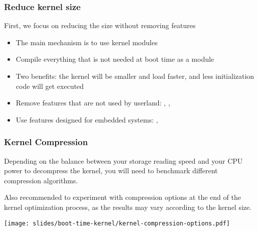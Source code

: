 \begin{frame}
\frametitle{Reduce kernel size}
First, we focus on reducing the size without removing features
\begin{itemize}
	\item The main mechanism is to use kernel modules
	\item Compile everything that is not needed at boot time as a
		module
	\item Two benefits: the kernel will be smaller and load faster, and
		less initialization code will get executed
	\item Remove features that are not used by userland:
		, ,
	\item Use features designed for embedded systems:
		, 
\end{itemize}
\end{frame}

\begin{frame}
\frametitle{Kernel Compression}
Depending on the balance between your storage reading speed and your
CPU power to decompress the kernel, you will need to benchmark
different compression algorithms.

Also recommended to experiment with compression options at the
end of the kernel optimization process, as the results may vary
according to the kernel size.
\begin{center}
    \texttt{[image: slides/boot-time-kernel/kernel-compression-options.pdf]}
\end{center}
\end{frame}


